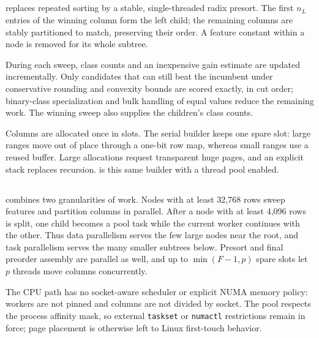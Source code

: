 \subsection{\ImplSerialOpt}
\label{sec:impl-serial}

\ImplSerialOpt{} replaces repeated sorting by a stable, single-threaded radix presort. The first \(n_L\) entries of the winning column form the left child; the remaining columns are stably partitioned to match, preserving their order. A feature constant within a node is removed for its whole subtree.

During each sweep, class counts and an inexpensive gain estimate are updated incrementally. Only candidates that can still beat the incumbent under conservative rounding and convexity bounds are scored exactly, in cut order; binary-class specialization and bulk handling of equal values reduce the remaining work. The winning sweep also supplies the children's class counts.

Columns are allocated once in slots. The serial builder keeps one spare slot: large ranges move out of place through a one-bit row map, whereas small ranges use a reused buffer. Large allocations request transparent huge pages, and an explicit stack replaces recursion. \ImplParallel{} is this same builder with a thread pool enabled.

\subsection{\ImplParallel}
\label{sec:impl-parallel}

\ImplParallel{} combines two granularities of work. Nodes with at least 32,768 rows sweep features and partition columns in parallel. After a node with at least 4,096 rows is split, one child becomes a pool task while the current worker continues with the other. Thus data parallelism serves the few large nodes near the root, and task parallelism serves the many smaller subtrees below. Presort and final preorder assembly are parallel as well, and up to \(\min(F-1,p)\) spare slots let \(p\) threads move columns concurrently.

The CPU path has no socket-aware scheduler or explicit NUMA memory policy: workers are not pinned and columns are not divided by socket. The pool respects the process affinity mask, so external \texttt{taskset} or \texttt{numactl} restrictions remain in force; page placement is otherwise left to Linux first-touch behavior.

\subsection{\ImplGpu}
\label{sec:impl-gpu}

